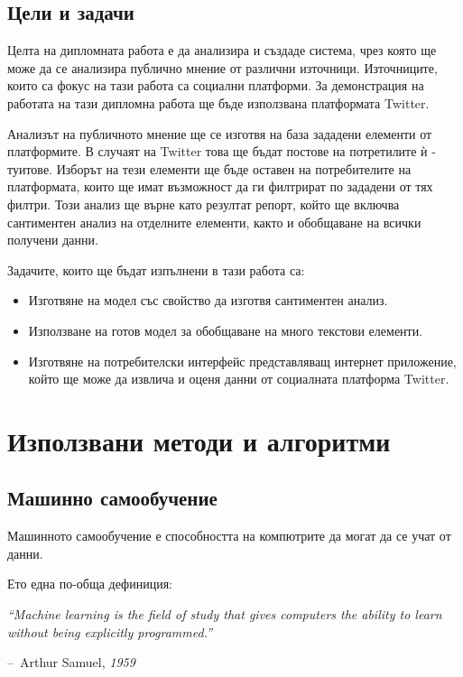 \documentclass{article}
\makeatletter
\newenvironment{chapquote}[2][2em]
{\setlength{\@tempdima}{#1}%
\def\chapquote@author{#2}%
\parshape 1 \@tempdima \dimexpr\textwidth-2\@tempdima\relax%
\itshape}
{\par\normalfont\hfill--\ \chapquote@author\hspace*{\@tempdima}\par\bigskip}
\makeatother
\begin{document}
\subsection{Цели и задачи}

Целта на дипломната работа е да анализира и създаде система, чрез която ще може да се анализира публично мнение от
различни източници. Източниците, които са фокус на тази работа са социални платформи. За демонстрация на работата на
тази дипломна работа ще бъде използвана платформата Twitter.

Анализът на публичното мнение ще се изготвя на база зададени елементи от платформите. В случаят на Twitter това ще
бъдат постове на потретилите ѝ - туитове. Изборът на тези елементи ще бъде оставен на потребителите на платформата,
които ще имат възможност да ги филтрират по зададени от тях филтри. Този анализ ще върне като резултат репорт, който ще
включва сантиментен анализ на отделните елементи, както и обобщаване на всички получени данни.

Задачите, които ще бъдат изпълнени в тази работа са:

\begin{itemize}
  \item Изготвяне на модел със свойство да изготвя сантиментен анализ.
  \item Използване на готов модел за обобщаване на много текстови елементи.
  \item Изготвяне на потребителски интерфейс представляващ интернет приложение, който ще може да извлича и оценя
  данни от социалната платформа Twitter.
\end{itemize}

\newpage\section{Използвани методи и алгоритми}

\subsection{Машинно самообучение}

Машинното самообучение е способността на компютрите да могат да се учат от данни.

Ето една по-обща дефиниция:

\begin{chapquote}{Arthur Samuel, \textit{1959}}
  ``Machine learning is the field of study that gives computers the ability to learn without being
  explicitly programmed.''
\end{chapquote}
\end{document}
